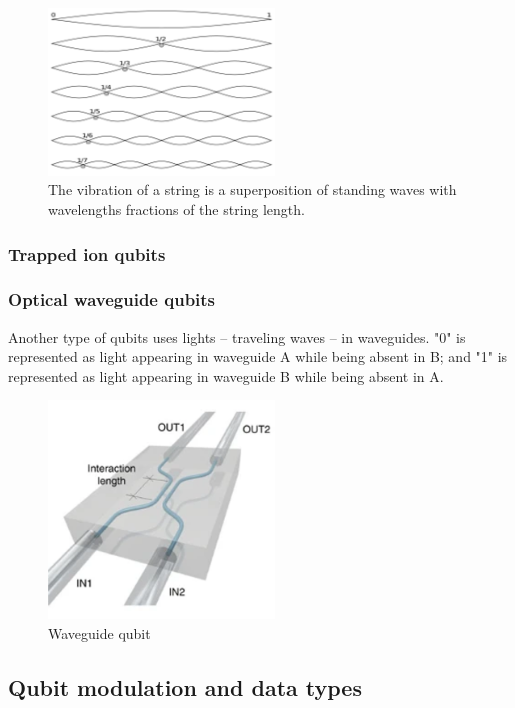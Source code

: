 \documentclass{book}
\begin{document}
\begin{figure}[ht]
\includegraphics[width=6cm]{pic/overtones.png}
\caption{The vibration of a string is a superposition of standing waves with wavelengths fractions of the string length.}
\label{Overtones}
\end{figure}

\subsubsection{Trapped ion qubits}

\subsubsection{Optical waveguide qubits}
Another type of qubits uses lights -- traveling waves -- in waveguides. "0" is represented as light appearing in waveguide A while being absent in B; and "1" is represented as light appearing in waveguide B while being absent in A.
\begin{figure}[ht]
\includegraphics[width=6cm]{pic/wguideQubit.png}
\caption{Waveguide qubit}
\label{Waveguide}
\end{figure}

\subsection{Qubit modulation and data types}
\end{document}
